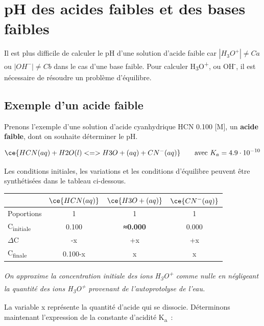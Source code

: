 \documentclass[
  11pt,
  a4paper,
  openany]{book}
\begin{document}
\clearpage

\hypertarget{ph-des-acides-faibles-et-des-bases-faibles}{%
\section{pH des acides faibles et des bases faibles}\label{ph-des-acides-faibles-et-des-bases-faibles}}

Il est plus difficile de calculer le pH d'une solution d'acide faible car \(|H_{3}O^{+}| \neq Ca\) ou \(|OH^{-}| \neq Cb\) dans le cas d'une base faible. Pour calculer \textbar H\textsubscript{3}O\textsuperscript{+}\textbar, ou \textbar OH\textsuperscript{-}\textbar, il est nécessaire de résoudre un problème d'équilibre.

\hypertarget{exemple-dun-acide-faible}{%
\subsection{Exemple d'un acide faible}\label{exemple-dun-acide-faible}}

Prenons l'exemple d'une solution d'acide cyanhydrique HCN 0.100 {[}M{]}, un \textbf{acide faible}, dont on souhaite déterminer le pH.

\[
\ce{HCN(aq) + H2O(l) <=> H3O+(aq) + CN^{-}(aq)} \qquad \text{avec } K_a = 4.9 \cdot 10^{-10}
\]

Les conditions initiales, les variations et les conditions d'équilibre peuvent être synthétisées dans le tableau ci-dessous.

\begin{longtable}[]{@{}lccc@{}}
\toprule()
& \(\ce{HCN(aq)}\) & \(\ce{H3O+(aq)}\) & \(\ce{CN^{-}(aq)}\) \\
\midrule()
\endhead
Poportions & 1 & 1 & 1 \\
C\textsubscript{initiale} & 0.100 & \textbf{≈0.000} & 0.000 \\
\(\Delta\)C & -x & +x & +x \\
C\textsubscript{finale} & 0.100-x & x & x \\
\bottomrule()
\end{longtable}

\emph{On approxime la concentration initiale des ions H\textsubscript{3}O\textsuperscript{+} comme nulle en négligeant la quantité des ions H\textsubscript{3}O\textsuperscript{+} provenant de l'autoprotolyse de l'eau.}

La variable x représente la quantité d'acide qui se dissocie. Déterminons maintenant l'expression de la constante d'acidité K\textsubscript{a}~:
\end{document}

